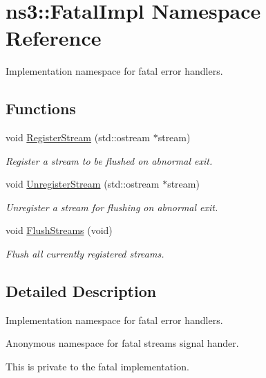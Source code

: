 \hypertarget{namespacens3_1_1FatalImpl}{}\section{ns3\+:\+:Fatal\+Impl Namespace Reference}
\label{namespacens3_1_1FatalImpl}


Implementation namespace for fatal error handlers.  


\subsection*{Functions}
\begin{DoxyCompactItemize}
\item 
void \hyperlink{group__fatalimpl_gad552ca3d6d85b95147b8c6a2eb4d4579}{Register\+Stream} (std\+::ostream $\ast$stream)
\begin{DoxyCompactList}\small\item\em Register a stream to be flushed on abnormal exit. \end{DoxyCompactList}\item 
void \hyperlink{group__fatalimpl_ga2bf70e98e990f01912527b4ccfac27d0}{Unregister\+Stream} (std\+::ostream $\ast$stream)
\begin{DoxyCompactList}\small\item\em Unregister a stream for flushing on abnormal exit. \end{DoxyCompactList}\item 
void \hyperlink{group__fatalimpl_gad96fb19ef26235aaccd15e6d2a72382f}{Flush\+Streams} (void)
\begin{DoxyCompactList}\small\item\em Flush all currently registered streams. \end{DoxyCompactList}\end{DoxyCompactItemize}


\subsection{Detailed Description}
Implementation namespace for fatal error handlers. 

Anonymous namespace for fatal streams signal hander.

This is private to the fatal implementation. 